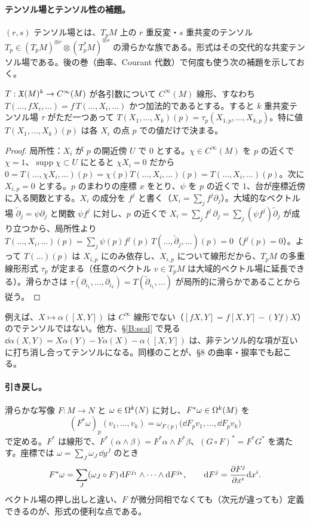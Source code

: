 \paragraph{テンソル場とテンソル性の補題。}$(r,s)$ テンソル場とは、$T_pM$ 上の $r$ 重反変・$s$ 重共変のテンソル $T_p\in (T_pM)^{\otimes r}\otimes (T_p^*M)^{\otimes s}$ の滑らかな族である。形式はその交代的な共変テンソル場である。後の巻（曲率、Courant 代数）で何度も使う次の補題を示しておく。

\begin{lem}[テンソル性]\label{B:lem:tensor}\tP
$T:\mathfrak X(M)^k\to C^\infty(M)$ が各引数について $C^\infty(M)$ 線形、すなわち $T(\dots,fX_i,\dots)=f\,T(\dots,X_i,\dots)$ かつ加法的であるとする。すると $k$ 重共変テンソル場 $\tau$ がただ一つあって $T(X_1,\dots,X_k)(p)=\tau_p(X_{1,p},\dots,X_{k,p})$。特に値 $T(X_1,\dots,X_k)(p)$ は各 $X_i$ の点 $p$ での値だけで決まる。
\end{lem}
\begin{proof}
局所性：$X_i$ が $p$ の開近傍 $U$ で $0$ とする。$\chi\in C^\infty(M)$ を $p$ の近くで $\chi=1$、$\operatorname{supp}\chi\subset U$ にとると $\chi X_i=0$ だから $0=T(\dots,\chi X_i,\dots)(p)=\chi(p)T(\dots,X_i,\dots)(p)=T(\dots,X_i,\dots)(p)$。次に $X_{i,p}=0$ とする。$p$ のまわりの座標 $x$ をとり、$\psi$ を $p$ の近くで $1$、台が座標近傍に入る関数とする。$X_i$ の成分を $f^j$ と書く（$X_i=\sum_jf^j\partial_j$）。大域的なベクトル場 $\tilde\partial_j=\psi\partial_j$ と関数 $\psi f^j$ に対し、$p$ の近くで $X_i=\sum_jf^j\,\partial_j=\sum_j(\psi f^j)\tilde\partial_j$ が成り立つから、局所性より
$T(\dots,X_i,\dots)(p)=\sum_j\psi(p)f^j(p)\,T(\dots,\tilde\partial_j,\dots)(p)=0$（$f^j(p)=0$）。よって $T(\dots)(p)$ は $X_{i,p}$ にのみ依存し、$X_{i,p}$ について線形だから、$T_pM$ の多重線形形式 $\tau_p$ が定まる（任意のベクトル $v\in T_pM$ は大域的ベクトル場に延長できる）。滑らかさは $\tau(\partial_{i_1},\dots,\partial_{i_k})=T(\tilde\partial_{i_1},\dots)$ が局所的に滑らかであることから従う。
\end{proof}

例えば、$X\mapsto\alpha([X,Y])$ は $C^\infty$ 線形でない（$[fX,Y]=f[X,Y]-(Yf)X$）のでテンソルではない。他方、\S\ref{B:ss:d} で見る $\dd\alpha(X,Y)=X\alpha(Y)-Y\alpha(X)-\alpha([X,Y])$ は、非テンソル的な項が互いに打ち消し合ってテンソルになる。同様のことが、§8 の曲率・捩率でも起こる。

\paragraph{引き戻し。}滑らかな写像 $F:M\to N$ と $\omega\in\Omega^k(N)$ に対し、$F^*\omega\in\Omega^k(M)$ を
\[
(F^*\omega)_p(v_1,\dots,v_k)=\omega_{F(p)}\bigl(\dd F_p v_1,\dots,\dd F_pv_k\bigr)
\]
で定める。$F^*$ は線形で、$F^*(\alpha\wedge\beta)=F^*\alpha\wedge F^*\beta$、$(G\circ F)^*=F^*G^*$ を満たす。座標では $\omega=\sum_J\omega_J\,\dd y^J$ のとき
\begin{equation}\label{B:eq:pullback}
F^*\omega=\sum_J(\omega_J\circ F)\,\mathrm{d} F^{j_1}\wedge\cdots\wedge\mathrm{d} F^{j_k},\qquad \mathrm{d} F^{j}=\frac{\partial F^j}{\partial x^i}\mathrm{d} x^i.
\end{equation}
ベクトル場の押し出しと違い、$F$ が微分同相でなくても（次元が違っても）定義できるのが、形式の便利な点である。

